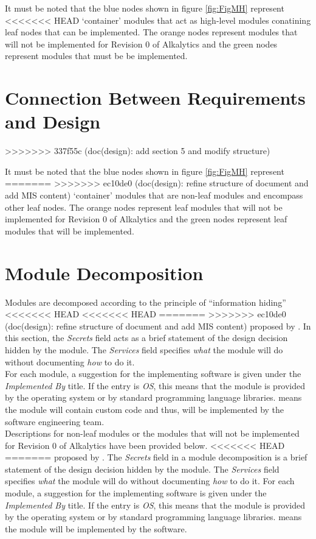 \documentclass[12pt, titlepage]{article}
\begin{document}
It must be noted that the blue nodes shown in figure \ref{fig:FigMH} represent 
<<<<<<< HEAD
`container' modules that act as high-level modules conatining leaf nodes that
can be implemented. The orange nodes represent modules that will not be implemented
for Revision 0 of Alkalytics and the green nodes represent modules that must be be implemented.

\section{Connection Between Requirements and Design} \label{SecConnection}
>>>>>>> 337f55c (doc(design): add section 5 and modify structure)

It must be noted that the blue nodes shown in figure \ref{fig:FigMH} represent 
=======
>>>>>>> ec10de0 (doc(design): refine structure of document and add MIS content)
`container' modules that are non-leaf modules and encompass other leaf nodes.
The orange nodes represent leaf modules that will not be implemented for Revision
0 of Alkalytics and the green nodes represent leaf modules that will be implemented.

\section{Module Decomposition} \label{SecMD}

Modules are decomposed according to the principle of ``information hiding''
<<<<<<< HEAD
<<<<<<< HEAD
=======
>>>>>>> ec10de0 (doc(design): refine structure of document and add MIS content)
proposed by \citet{ParnasEtAl1984}. In this section, the \emph{Secrets} field acts as a brief
statement of the design decision hidden by the module. The \emph{Services} field specifies
\emph{what} the module will do without documenting \emph{how} to do it.\\
\newline
For each module, a suggestion for the implementing software is given under the 
\emph{Implemented By} title. If the entry is \emph{OS}, this means that the module is
provided by the operating system or by standard programming language libraries.
\emph{\progname{}} means the module will contain custom code and thus, will be implemented
by the software engineering team.\\
\newline
Descriptions for non-leaf modules or the modules that will not be implemented for Revision 0 of
Alkalytics have been provided below.
<<<<<<< HEAD
=======
proposed by \citet{ParnasEtAl1984}. The \emph{Secrets} field in a module
decomposition is a brief statement of the design decision hidden by the
module. The \emph{Services} field specifies \emph{what} the module will do
without documenting \emph{how} to do it. For each module, a suggestion for the
implementing software is given under the \emph{Implemented By} title. If the
entry is \emph{OS}, this means that the module is provided by the operating
system or by standard programming language libraries.  \emph{\progname{}} means the
module will be implemented by the \progname{} software.
\end{document}
